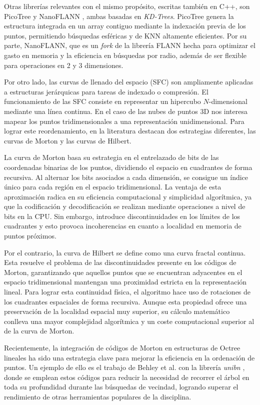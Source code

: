 Otras librerías relevantes con el mismo propósito, escritas también en C++, son PicoTree \cite{repo_pico_tree} y NanoFLANN \cite{doc_nanoflann}, ambas basadas en \textit{KD-Trees}. PicoTree genera la estructura integrada en un array contiguo mediante la indexación previa de los puntos, permitiendo búsquedas esféricas y de KNN altamente eficientes. Por su parte, NanoFLANN, que es un \textit{fork} de la librería FLANN hecha para optimizar el gasto en memoria y la eficiencia en búsquedas por radio, además de ser flexible para operaciones en 2 y 3 dimensiones.

Por otro lado, las curvas de llenado del espacio (SFC) \cite{wiki_curva_llenado} son ampliamente aplicadas a estructuras jerárquicas para tareas de indexado o compresión. El funcionamiento de las SFC consiste en representar un hipercubo $N$-dimensional mediante una línea continua. En el caso de las nubes de puntos 3D nos interesa mapear los puntos tridimensionales a una representación unidimensional. Para lograr este reordenamiento, en la literatura destacan dos estrategias diferentes, las curvas de Morton y las curvas de Hilbert.

La curva de Morton  basa su estrategia en el entrelazado de bits de las coordenadas binarias de los puntos, dividiendo el espacio en cuadrantes de forma recursiva. Al alternar los bits asociados a cada dimensión, se consigue un índice único para cada región en el espacio tridimensional. La ventaja de esta aproximación radica en su  eficiencia computacional y simplicidad algorítmica, ya que la codificación y decodificación se realizan mediante operaciones a nivel de bits en la CPU. Sin embargo, introduce discontinuidades en los límites de los cuadrantes y esto provoca incoherencias en cuanto a localidad en memoria de puntos próximos.

Por el contrario, la curva de Hilbert se define como una curva fractal continua. Esta resuelve el problema de las discontinuidades presente en los códigos de Morton, garantizando que aquellos puntos que se encuentran adyacentes en el espacio tridimensional mantengan una proximidad estricta en la representación lineal. Para lograr esta continuidad física, el algoritmo hace uso de rotaciones de los cuadrantes espaciales de forma recursiva. Aunque esta propiedad ofrece una preservación de la localidad espacial muy superior, su cálculo matemático conlleva una mayor complejidad algorítmica y un coste computacional superior al de la curva de Morton.

Recientemente, la integración de códigos de Morton en estructuras de Octree lineales ha sido una estrategia clave para mejorar la eficiencia en la ordenación de puntos. Un ejemplo de ello es el trabajo de Behley et al. con la librería \textit{unibn} \cite{unibn}, donde se emplean estos códigos para reducir la necesidad de recorrer el árbol en toda su profundidad durante las búsquedas de vecindad, logrando superar el rendimiento de otras herramientas populares de la disciplina. 

